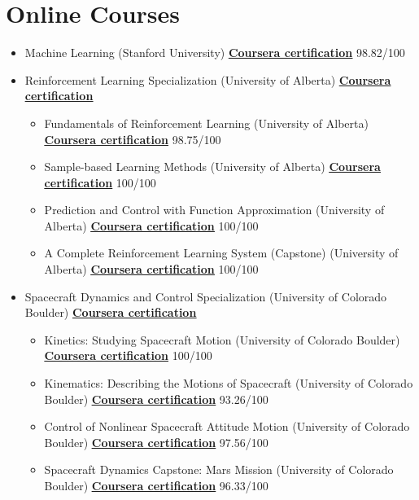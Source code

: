 \documentclass[10pt,a4paper,times]{moderncv}
\begin{document}
\section{Online Courses}

	\begin{itemize}
		\item Machine Learning (Stanford University)  \textbf{\href{https://coursera.org/verify/BCTCN2JXRGRD} {\underline{Coursera certification}}}	\hfill{98.82/100}
		
		\item Reinforcement Learning Specialization (University of Alberta)  \textbf{\href{https://coursera.org/verify/specialization/DHSXE3N9K4FL} {\underline{Coursera certification}}}  					 	\hfill{ } 
		\begin{itemize}
		\item Fundamentals of Reinforcement Learning (University of Alberta)  \textbf{\href{https://coursera.org/verify/9BYJ37J7UPAY} {\underline{Coursera certification}}}  					 	\hfill{98.75/100} 
		\item Sample-based Learning Methods (University of Alberta)  \textbf{\href{https://coursera.org/verify/CWRNZTCFMHWH} {\underline{Coursera certification}}}  					 	\hfill{100/100}
		\item Prediction and Control with Function Approximation (University of Alberta)  \textbf{\href{https://coursera.org/verify/JRM3TQND7S3E} {\underline{Coursera certification}}}  					 	\hfill{100/100}
		\item A Complete Reinforcement Learning System (Capstone) (University of Alberta)  \textbf{\href{https://coursera.org/verify/6Y8KGFC7RMDF} {\underline{Coursera certification}}}  					 	\hfill{100/100}
		\end{itemize}
		\item Spacecraft Dynamics and Control Specialization (University of Colorado Boulder)  \textbf{\href{https://coursera.org/verify/specialization/JUZXB4A8MCKZ} {\underline{Coursera certification}}}	\hfill{ }
		\begin{itemize}
		\item Kinetics: Studying Spacecraft Motion (University of Colorado Boulder)  \textbf{\href{https://coursera.org/verify/E9RVRNYBTUFB} {\underline{Coursera certification}}}	\hfill{100/100}
		\item Kinematics: Describing the Motions of Spacecraft (University of Colorado Boulder)  \textbf{\href{https://coursera.org/verify/G53HFNRJ9JBL} {\underline{Coursera certification}}}	\hfill{93.26/100}
		\item Control of Nonlinear Spacecraft Attitude Motion (University of Colorado Boulder)  \textbf{\href{https://coursera.org/verify/B4XDEQFM6ZDY} {\underline{Coursera certification}}}	\hfill{97.56/100}
		\item Spacecraft Dynamics Capstone: Mars Mission (University of Colorado Boulder)  \textbf{\href{https://coursera.org/verif y/DDJTUCGB66BG} {\underline{Coursera certification}}}	\hfill{96.33/100}
		\end{itemize}
	\end{itemize}
\end{document}
